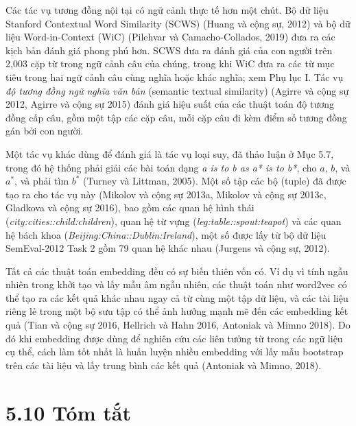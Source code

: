 Các tác vụ tương đồng nội tại có ngữ cảnh thực tế hơn một chút. Bộ dữ liệu Stanford Contextual Word Similarity (SCWS) (Huang và cộng sự, 2012) và bộ dữ liệu Word-in-Context (WiC) (Pilehvar và Camacho-Collados, 2019) đưa ra các kịch bản đánh giá phong phú hơn. SCWS đưa ra đánh giá của con người trên 2,003 cặp từ trong ngữ cảnh câu của chúng, trong khi WiC đưa ra các từ mục tiêu trong hai ngữ cảnh câu cùng nghĩa hoặc khác nghĩa; xem Phụ lục I. Tác vụ \emph{độ tương đồng ngữ nghĩa văn bản} (semantic textual similarity) (Agirre và cộng sự 2012, Agirre và cộng sự 2015) đánh giá hiệu suất của các thuật toán độ tương đồng cấp câu, gồm một tập các cặp câu, mỗi cặp câu đi kèm điểm số tương đồng gán bởi con người.

Một tác vụ khác dùng để đánh giá là tác vụ loại suy, đã thảo luận ở Mục 5.7, trong đó hệ thống phải giải các bài toán dạng \emph{a is to b as a* is to b*}, cho $a$, $b$, và $a^*$, và phải tìm $b^*$ (Turney và Littman, 2005). Một số tập các bộ (tuple) đã được tạo ra cho tác vụ này (Mikolov và cộng sự 2013a, Mikolov và cộng sự 2013c, Gladkova và cộng sự 2016), bao gồm các quan hệ hình thái (\emph{city:cities::child:children}), quan hệ từ vựng (\emph{leg:table::spout:teapot}) và các quan hệ bách khoa (\emph{Beijing:China::Dublin:Ireland}), một số được lấy từ bộ dữ liệu SemEval-2012 Task 2 gồm 79 quan hệ khác nhau (Jurgens và cộng sự, 2012).

Tất cả các thuật toán embedding đều có sự biến thiên vốn có. Ví dụ vì tính ngẫu nhiên trong khởi tạo và lấy mẫu âm ngẫu nhiên, các thuật toán như word2vec có thể tạo ra các kết quả khác nhau ngay cả từ cùng một tập dữ liệu, và các tài liệu riêng lẻ trong một bộ sưu tập có thể ảnh hưởng mạnh mẽ đến các embedding kết quả (Tian và cộng sự 2016, Hellrich và Hahn 2016, Antoniak và Mimno 2018). Do đó khi embedding được dùng để nghiên cứu các liên tưởng từ trong các ngữ liệu cụ thể, cách làm tốt nhất là huấn luyện nhiều embedding với lấy mẫu bootstrap trên các tài liệu và lấy trung bình các kết quả (Antoniak và Mimno, 2018).

\section{5.10 Tóm tắt}

